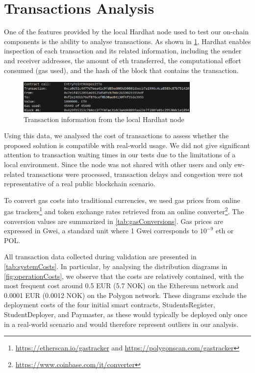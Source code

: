 \section{Transactions Analysis}
One of the features provided by the local Hardhat node used to test our on-chain components is the ability to analyse transactions. As shown in \cref{fig:exampleTransaction}, Hardhat enables inspection of each transaction and its related information, including the sender and receiver addresses, the amount of \gls{eth} transferred, the computational effort consumed (gas used), and the hash of the block that contains the transaction.
\begin{figure}
  \centering
  \includegraphics[width=0.8\textwidth]{figures/hardhatExample.png}
  \caption[Transaction information from the local Hardhat node]{Transaction information from the local Hardhat node}
  \label{fig:exampleTransaction}
\end{figure}

Using this data, we analysed the cost of transactions to assess whether the proposed solution is compatible with real-world usage. We did not give significant attention to transaction waiting times in our tests due to the limitations of a local environment. Since the node was not shared with other users and only \gls{ew}-related transactions were processed, transaction delays and congestion were not representative of a real public blockchain scenario.

To convert gas costs into traditional currencies, we used gas prices from online gas trackers\footnote{\url{https://etherscan.io/gastracker} and \url{https://polygonscan.com/gastracker}} and token exchange rates retrieved from an online converter\footnote{\url{https://www.coinbase.com/it/converter}}. The conversion values are summarized in \cref{tab:gasConversions}. Gas prices are expressed in Gwei, a standard unit where 1 Gwei corresponds to $10^{-9}$ \gls{eth} or POL.



All transaction data collected during validation are presented in \cref{tab:systemCosts}. In particular, by analysing the distribution diagrams in \cref{fig:operationCosts}, we observe that the costs are relatively contained, with the most frequent cost around 0.5 EUR (5.7 NOK) on the Ethereum network and 0.0001 EUR (0.0012 NOK) on the Polygon network. These diagrams exclude the deployment costs of the four initial smart contracts, StudentsRegister, StudentDeployer, and Paymaster, as these would typically be deployed only once in a real-world scenario and would therefore represent outliers in our analysis.

